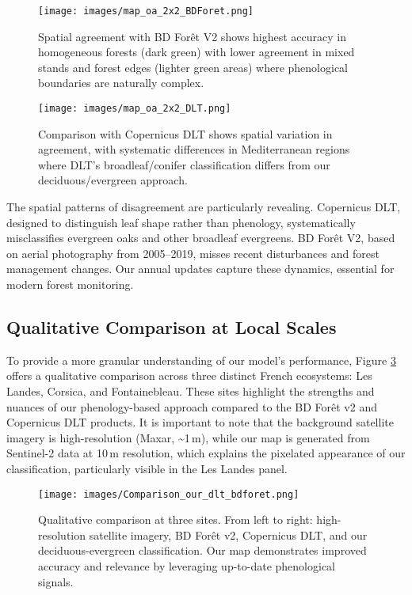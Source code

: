 \documentclass[utf8]{FrontiersinHarvard}
\begin{document}
\begin{figure}[H]
    \centering
    \texttt{[image: images/map\_oa\_2x2\_BDForet.png]}
    \caption{Spatial agreement with BD Forêt V2 shows highest accuracy in homogeneous forests (dark green) with lower agreement in mixed stands and forest edges (lighter green areas) where phenological boundaries are naturally complex.}
    \label{fig:agreement_bdf}
\end{figure}

\begin{figure}[H]
    \centering
    \texttt{[image: images/map\_oa\_2x2\_DLT.png]}
    \caption{Comparison with Copernicus DLT shows spatial variation in agreement, with systematic differences in Mediterranean regions where DLT's broadleaf/conifer classification differs from our deciduous/evergreen approach.}
    \label{fig:agreement_dlt}
\end{figure}

The spatial patterns of disagreement are particularly revealing. Copernicus DLT, designed to distinguish leaf shape rather than phenology, systematically misclassifies evergreen oaks and other broadleaf evergreens. BD Forêt V2, based on aerial photography from 2005–2019, misses recent disturbances and forest management changes. Our annual updates capture these dynamics, essential for modern forest monitoring.

\subsection{Qualitative Comparison at Local Scales}

To provide a more granular understanding of our model's performance, Figure \ref{fig:comparison_sites} offers a qualitative comparison across three distinct French ecosystems: Les Landes, Corsica, and Fontainebleau. These sites highlight the strengths and nuances of our phenology-based approach compared to the BD Forêt v2 and Copernicus DLT products. It is important to note that the background satellite imagery is high-resolution (Maxar, \textasciitilde1\,m), while our map is generated from Sentinel-2 data at 10\,m resolution, which explains the pixelated appearance of our classification, particularly visible in the Les Landes panel.

\begin{figure}[H]
    \centering
    \texttt{[image: images/Comparison\_our\_dlt\_bdforet.png]}
    \caption{Qualitative comparison at three sites. From left to right: high-resolution satellite imagery, BD Forêt v2, Copernicus DLT, and our deciduous-evergreen classification. Our map demonstrates improved accuracy and relevance by leveraging up-to-date phenological signals.}
    \label{fig:comparison_sites}
\end{figure}
\end{document}
